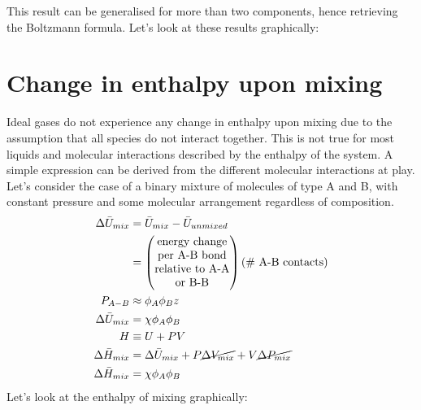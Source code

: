 \documentclass[a4paper, 11pt, normalem]{report}
\begin{document}
This result can be generalised for more than two components, hence retrieving the Boltzmann formula.
Let's look at these results graphically:
\begin{figure}[H]
    \centering
\end{figure}

\section{Change in enthalpy upon mixing}
Ideal gases do not experience any change in enthalpy upon mixing due to the assumption that all species do not interact together. 
This is not true for most liquids and molecular interactions described by the enthalpy of the system. 
A simple expression can be derived from the different molecular interactions at play. 
Let's consider the case of a binary mixture of molecules of type A and B, with constant pressure and some molecular arrangement regardless of composition. 
\begin{align}
    \Delta\bar{U}_{mix} &= \bar{U}_{mix} - \bar{U}_{unmixed} \\
                        &= \begin{pmatrix} \text{energy change} \\ \text{per A-B bond} \\ \text{relative to A-A} \\ \text{or B-B} \end{pmatrix} (\text{\# A-B contacts}) \\
    P_{A-B} &\approx \phi_A\phi_Bz \\
    \Delta\bar{U}_{mix} &= \chi\phi_A\phi_B \\
    H &\equiv U + PV \\
    \Delta\bar{H}_{mix} &= \Delta\bar{U}_{mix} + P\cancel{\Delta V_{mix}} + V\cancel{\Delta P_{mix}} \\
    \Delta\bar{H}_{mix} &= \chi\phi_A\phi_B
\end{align}
Let's look at the enthalpy of mixing graphically:
\end{document}
